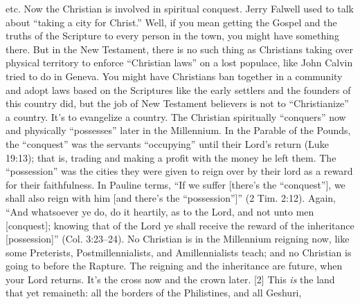 {etc. Now the Christian is involved in spiritual conquest. Jerry Falwell used to talk about
“taking a city for Christ.” Well, if you mean getting the Gospel and the truths of the
Scripture to every person in the town, you might have something there. But in the New
Testament, there is no such thing as Christians taking over physical territory to enforce
“Christian laws” on a lost populace, like John Calvin tried to do in Geneva. You might have
Christians ban together in a community and adopt laws based on the Scriptures like the early
settlers and the founders of this country did, but the job of New Testament believers is not to
“Christianize” a country. It’s to evangelize a country.
The Christian spiritually “conquers” now
and physically “possesses” later in the
Millennium. In the Parable of the Pounds, the
“conquest” was the servants “occupying” until
their Lord’s return (Luke 19:13); that is, trading
and making a profit with the money he left
them. The “possession” was the cities they were
given to reign over by their lord as a reward for
their faithfulness. In Pauline terms, “If we
suffer [there’s the “conquest”], we shall also
reign with him [and there’s the “possession”]”
(2 Tim. 2:12).
Again, “And whatsoever ye do, do it heartily, as to the Lord, and not unto men [conquest]; knowing that of the Lord ye shall receive the reward of the inheritance [possession]” (Col. 3:23–24). No Christian is in the Millennium reigning now, like some Preterists, Postmillennialists, and Amillennialists teach; and no Christian is going to before the Rapture. The reigning and the inheritance are future, when your Lord returns. It’s the cross now and the crown later.}
[2] \textcolor[rgb]{0.00,0.00,1.00}{This \emph{is} the land that yet remaineth: all the borders of the Philistines, and all Geshuri,}
